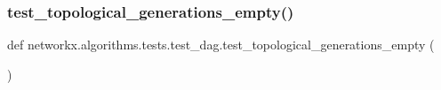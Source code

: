 \subsubsection{\texorpdfstring{test\+\_\+topological\+\_\+generations\+\_\+empty()}{test\_topological\_generations\_empty()}}
{\footnotesize\ttfamily def networkx.\+algorithms.\+tests.\+test\+\_\+dag.\+test\+\_\+topological\+\_\+generations\+\_\+empty (\begin{DoxyParamCaption}{ }\end{DoxyParamCaption})}

